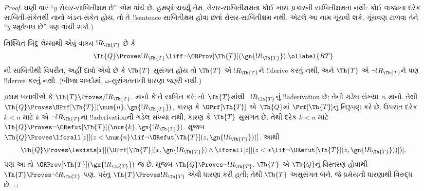 \documentclass[../../../include/open-logic-section]{subfiles}
\begin{document}
\begin{proof}
ઘણી વાર ``$y$ રોસર-સાબિતીક્ષમ
છે'' એમ વાંચે છે.
હમણાં ચર્ચ્યું તેમ,
રોસર-સાબિતીક્ષમતા કોઈ
ખાસ પ્રકારની સાબિતીક્ષમતા
નથી: કોઈ વાક્યના દરેક સાબિતી-સંકેતથી નાનો
ખંડન-સંકેત હોય, તો તે !!{sentence}
સાબિતીક્ષમ હોવા છતાં રોસર-સાબિતીક્ષમ નથી.
એટલે આ નામ ગૂંચવી શકે.
ગૂંચવણ ટાળવા તેને
``$y$ શ્મૂવેબલ છે'' પણ
વાંચી શકો.)

નિશ્ચિત-બિંદુ લેમ્માથી એવું
વાક્ય $!R_\Th{T}$ છે કે
\begin{equation}
  \Th{Q} \Proves !R_\Th{T} \liff \lnot \ORProv[\Th{T}](\gn{!R_\Th{T}}).
  \ollabel{RT}
\end{equation}
ની
સાબિતીથી વિપરીત, અહીં
દાવો એવો છે કે
$\Th{T}$ સુસંગત હોય તો
$\Th{T}$ એ $!R_\Th{T}$ને
!!{derive} કરતું નથી,
અને $\Th{T}$ એ
$\lnot !R_\Th{T}$ને પણ
!!{derive} કરતું નથી.
(બીજા શબ્દોમાં,
$\omega$-સુસંગતતાની
ધારણા જરૂરી નથી.)

પ્રથમ બતાવીએ કે
$\Th{T} \Proves/ !R_{\Th{T}}$.
માનો કે તે સાબિત કરે;
તો~$\Th{T}$માંથી
~$!R_{\Th{T}}$નું
!!a{derivation} છે;
તેની ગડેલ સંખ્યા~$n$
માનો. તેથી
$\Th{Q} \Proves \OPrf[\Th{T}](\num{n}, \gn{!R_{\Th{T}}})$,
કારણ કે $\OPrf[\Th{T}]$
એ~$\Th{Q}$માં
$\Prf[\Th{T}]$નું નિરૂપણ
કરે છે. ઉપરાંત દરેક
$k < n$ માટે $k$ એ
$\lnot !R_{\Th{T}}$ના
!!a{derivation}ની ગડેલ
સંખ્યા નથી, કારણ કે
$\Th{T}$ સુસંગત છે.
તેથી દરેક $k < n$ માટે
$\Th{Q} \Proves \lnot
\ORefut[\Th{T}](\num{k}, \gn{!R_{\Th{T}}})$.
મુજબ
$\Th{Q} \Proves \lforall[z][(z < \num{n} \lif \lnot \ORefut[\Th{T}](z,
  \gn{!R_{\Th{T}}}))]$.
આથી
\[
\Th{Q} \Proves \lexists[x][(\OPrf[\Th{T}](x,\gn{!R_{\Th{T}}}) \land \lforall[z][(z
    < x \lif \lnot \ORefut[\Th{T}](z,\gn{!R_{\Th{T}}}))])],
\]
પણ આ તો
$\ORProv[\Th{T}](\gn{!R_{\Th{T}}})$
જ છે.  મુજબ
$\Th{Q}
\Proves \lnot !R_{\Th{T}}$.
$\Th{T}$ એ $\Th{Q}$નું
વિસ્તરણ હોવાથી
$\Th{T}
\Proves \lnot !R_{\Th{T}}$
પણ. પરંતુ
$\Th{T} \Proves !R_{\Th{T}}$
એવી ધારણા કરી હતી;
તેથી $\Th{T}$ અસુસંગત
બને, જે પ્રમેયની
ધારણાથી વિરુદ્ધ છે.


\end{proof}
\end{document}
